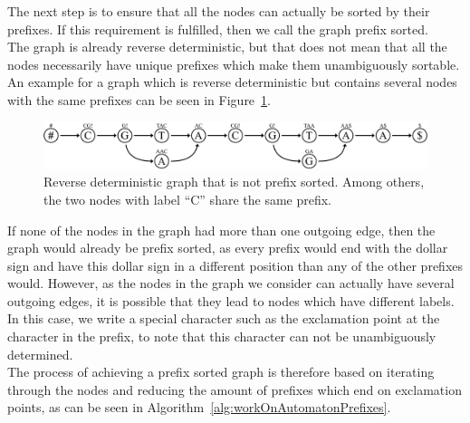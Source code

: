 \documentclass[a4paper,12pt,twoside,BCOR=10mm]{scrbook}
\begin{document}
The next step is to ensure that all the nodes can actually be sorted by their prefixes.
If this requirement is fulfilled, then we call the graph prefix sorted. \\
The graph is already reverse deterministic, but that does not mean that all the nodes
necessarily have unique prefixes which make them unambiguously sortable.
An example for a graph which is reverse deterministic but contains several nodes
with the same prefixes can be seen in Figure~\ref{fig:evo_gml_rev_det_but_not_prev_sort}.
\begin{figure}[!htb]
\centering
\includegraphics[width=\textwidth]{evo_gml_rev_det_but_not_prev_sort.pdf}
\caption[Reverse deterministic graph that is not prefix sorted]{Reverse deterministic graph that is not prefix sorted. Among others, the two nodes with label \textup{“C”} share the same prefix.} \label{fig:evo_gml_rev_det_but_not_prev_sort}
\end{figure}
If none of the nodes in the graph had more than one outgoing edge, then the graph
would already be prefix sorted, as every prefix would end with the dollar sign
and have this dollar sign in a different position than any of the other prefixes would.
However, as the nodes in the graph we consider can actually have several outgoing edges,
it is possible that they lead to nodes which have different labels. In this case,
we write a special character such as the exclamation point at the character in the prefix,
to note that this character can not be unambiguously determined. \\
The process of achieving a prefix sorted graph is therefore based on iterating through
the nodes and reducing the amount of
prefixes which end on exclamation points, as can be seen in Algorithm~\ref{alg:workOnAutomatonPrefixes}.
\end{document}
